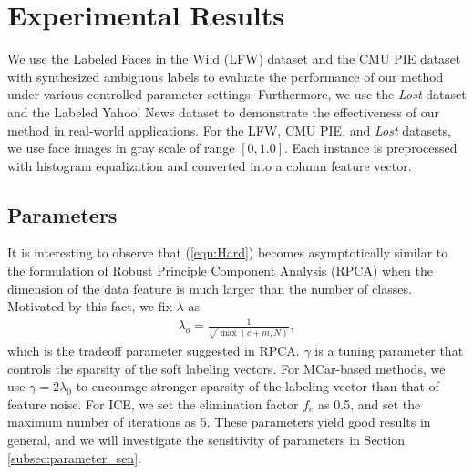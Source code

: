 \documentclass[10pt,journal,compsoc]{IEEEtran}
\begin{document}
\section{Experimental Results} \label{Chapter_MCar:sec:results}

We use the Labeled Faces in the Wild (LFW) dataset \cite{Huang2007} and the CMU PIE dataset with synthesized ambiguous labels to evaluate the performance of our method under various controlled parameter settings. Furthermore, we use the \emph{Lost} dataset \cite{Cour2009} and the Labeled Yahoo! News dataset \cite{Berg2004,Guillaumin2010} to demonstrate the effectiveness of our method in real-world applications. For the LFW, CMU PIE, and \emph{Lost} datasets, we use face images in gray scale of range $[0, 1.0]$. Each instance is preprocessed with histogram equalization and converted into a column feature vector.


\subsection{Parameters} \label{sec:exp:parameters}

It is interesting to observe that (\ref{eqn:Hard}) becomes asymptotically similar to the formulation of Robust Principle Component Analysis (RPCA) \cite{Candes2011} when the dimension of the data feature is much larger than the number of classes. Motivated by this fact, we fix $\lambda$ as
\begin{align}
     \lambda_o = \frac{1}{\sqrt{\max(c+m, N)}}, \label{eqn:lambda_opt}
\end{align}
which is the tradeoff parameter suggested in RPCA. $\gamma$ is a tuning parameter that controls the sparsity of the soft labeling vectors. For MCar-based methods, we use $\gamma = 2 \lambda_0$ to encourage stronger sparsity of the labeling vector than that of feature noise. For ICE, we set the elimination factor $f_e$ as 0.5, and set the maximum number of iterations as 5. These parameters yield good results in general, and we will investigate the sensitivity of parameters in Section \ref{subsec:parameter_sen}.
\end{document}
